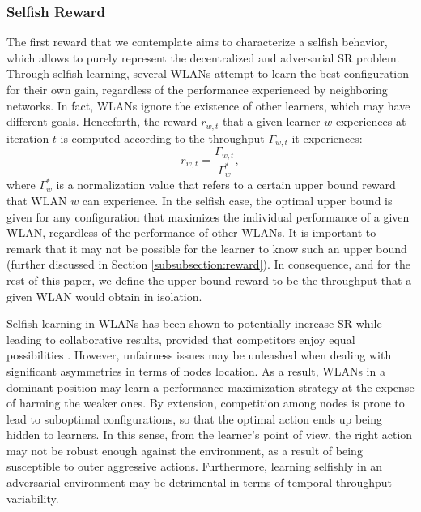 \documentclass[preprint,12pt]{elsarticle}
\begin{document}
\subsubsection{Selfish Reward}
\label{subsubsection:selfish_learning}
The first reward that we contemplate aims to characterize a selfish behavior, which allows to purely represent the decentralized and adversarial SR problem. Through selfish learning, several WLANs attempt to learn the best configuration for their own gain, regardless of the performance experienced by neighboring networks. In fact, WLANs ignore the existence of other learners, which may have different goals. Henceforth, the reward $r_{w,t}$ that a given learner $w$ experiences at iteration $t$ is computed according to the throughput $\Gamma_{w,t}$ it experiences: 
\begin{equation}
r_{w,t} = \frac{\Gamma_{w,t}}{\Gamma_w^*}, 
\nonumber
\end{equation}		
where $\Gamma_w^*$ is a normalization value that refers to a certain upper bound reward that WLAN $w$ can experience. In the selfish case, the optimal upper bound is given for any configuration that maximizes the individual performance of a given WLAN, regardless of the performance of other WLANs. It is important to remark that it may not be possible for the learner to know such an upper bound (further discussed in Section \ref{subsubsection:reward}). In consequence, and for the rest of this paper, we define the upper bound reward to be the throughput that a given WLAN would obtain in isolation.

Selfish learning in WLANs has been shown to potentially increase SR while leading to collaborative results, provided that competitors enjoy equal possibilities \cite{wilhelmi2017collaborative}. However, unfairness issues may be unleashed when dealing with significant asymmetries in terms of nodes location. As a result, WLANs in a dominant position may learn a performance maximization strategy at the expense of harming the weaker ones. By extension, competition among nodes is prone to lead to suboptimal configurations, so that the optimal action ends up being hidden to learners. In this sense, from the learner's point of view, the right action may not be robust enough against the environment, as a result of being susceptible to outer aggressive actions. Furthermore, learning selfishly in an adversarial environment may be detrimental in terms of temporal throughput variability. 

\end{document}
